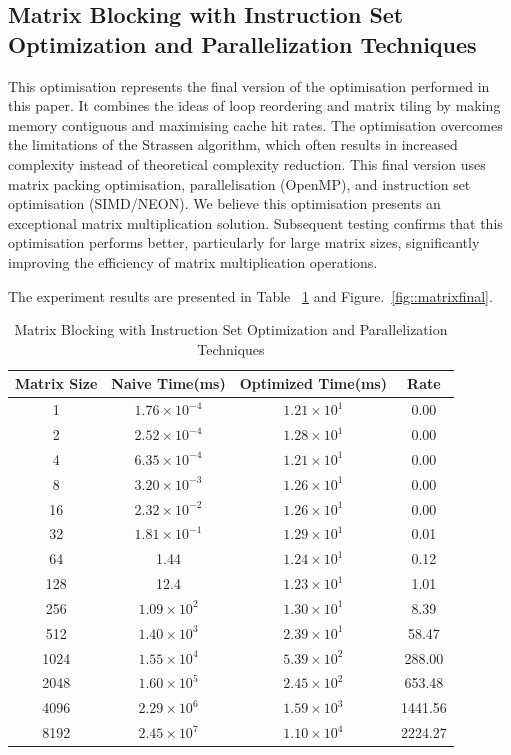 \documentclass[conference]{IEEEtran}
\begin{document}
	\subsection{Matrix Blocking with Instruction Set Optimization and Parallelization Techniques}
	
	This optimisation represents the final version of the optimisation performed in this paper. It combines the ideas of loop reordering and matrix tiling by making memory contiguous and maximising cache hit rates. The optimisation overcomes the limitations of the Strassen algorithm, which often results in increased complexity instead of theoretical complexity reduction. This final version uses matrix packing optimisation, parallelisation (OpenMP), and instruction set optimisation (SIMD/NEON). We believe this optimisation presents an exceptional matrix multiplication solution. Subsequent testing confirms that this optimisation performs better, particularly for large matrix sizes, significantly improving the efficiency of matrix multiplication operations.
	
	The experiment results are presented in Table ~\ref{tab:matrixfinal} and Figure.~\ref{fig::matrixfinal}.
	
	\begin{table}[h]
		\centering
		\setlength\extrarowheight{2pt}
		\caption{Matrix Blocking with Instruction Set Optimization and Parallelization Techniques}
		\label{tab:matrixfinal}
		\begin{tabular}{|c|c|c|c|}
			\hline
			Matrix Size & Naive Time(ms)& Optimized Time(ms) & Rate \\ \hline
			1 & $1.76 \times 10^{-4}$ & $1.21 \times 10^{1}$ & 0.00 \\ 
			2 & $2.52\times 10^{-4}$ & $1.28 \times 10^{1}$ & 0.00 \\ 
			4 & $6.35 \times 10^{-4}$ & $1.21\times 10^{1}$ & 0.00 \\ 
			8 & $3.20 \times 10^{-3}$ & $1.26 \times 10^{1}$ & 0.00 \\ 
			16 & $2.32 \times 10^{-2}$ & $1.26 \times 10^{1}$ & 0.00 \\ 
			32 & $1.81 \times 10^{-1}$ & $1.29 \times 10^{1}$ & 0.01 \\ 
			64 & 1.44 & $1.24 \times 10^{1}$ & 0.12 \\ 
			128 & 12.4 & $1.23 \times 10^{1}$ & 1.01 \\ 
			256 & $1.09 \times 10^{2}$ & $1.30 \times 10^{1}$ & 8.39 \\ 
			512 & $1.40 \times 10^{3}$ & $2.39\times 10^{1}$ & 58.47 \\ 
			1024 & $1.55 \times 10^{4}$ & $5.39 \times 10^{2}$ & 288.00 \\ 
			2048 & $1.60 \times 10^{5}$ & $2.45 \times 10^{2}$ & 653.48 \\ 
			4096 & $2.29 \times 10^{6}$ & $1.59 \times 10^{3}$ & 1441.56 \\ 
			8192 & $2.45 \times 10^{7}$ & $1.10 \times 10^{4}$ & 2224.27 \\ \hline
		\end{tabular}
	\end{table}
	
\end{document}
